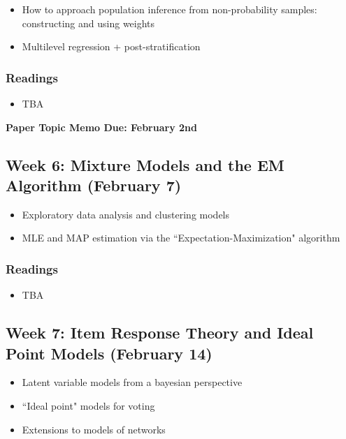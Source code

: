 \documentclass[11pt, article, oneside]{memoir}
\theoremstyle{Assumption}
\begin{document}
\begin{itemize}
\item How to approach population inference from non-probability samples: constructing and using weights
\item Multilevel regression + post-stratification
\end{itemize}

\subsubsection*{Readings}

\begin{itemize}
\item TBA
\end{itemize}

\textbf{Paper Topic Memo Due: February 2nd}

\subsection{Week 6: Mixture Models and the EM Algorithm (February 7)}

\begin{itemize}
\item Exploratory data analysis and clustering models
\item MLE and MAP estimation via the ``Expectation-Maximization" algorithm
\end{itemize}

\subsubsection*{Readings}

\begin{itemize}
\item TBA
\end{itemize}

\subsection{Week 7: Item Response Theory and Ideal Point Models (February 14)}

\begin{itemize}
\item Latent variable models from a bayesian perspective
\item ``Ideal point" models for voting
\item Extensions to models of networks 
\end{itemize}
\end{document}
